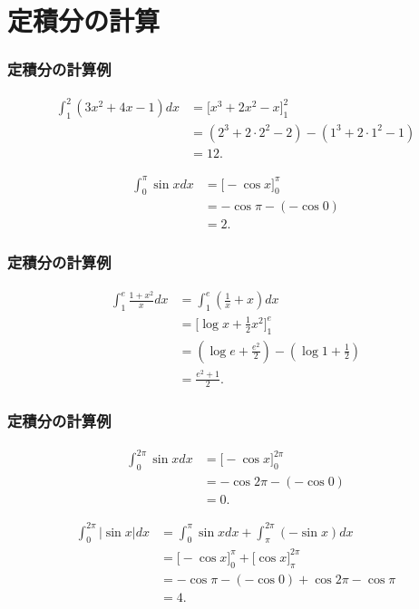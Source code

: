 \section{定積分の計算}

\begin{frame}
\frametitle{定積分の計算例}

\begin{align*}
\int_1^2(3x^2+4x-1)dx & = \big[x^3+2x^2-x\big]_1^2 \\
& = (2^3+2\cdot 2^2-2)-(1^3+2\cdot 1^2-1) \\
& = 12. 
\end{align*}


\begin{align*}
\int_0^\pi \sin x dx & = \big[ -\cos x\big]_0^\pi \\
& = -\cos \pi - (- \cos 0) \\
& = 2. 
\end{align*}

\end{frame}




\begin{frame}
\frametitle{定積分の計算例}

\begin{align*}
\int_1^e\frac{1+x^2}{x}dx & = \int_1^e(\frac{1}{x}+x)dx \\
& = \big[ \log x + \frac{1}{2}x^2\big]_1^e \\
& = (\log e + \frac{e^2}{2})-(\log 1 +\frac{1}{2})\\
& = \frac{e^2+1}{2}. 
\end{align*}


\end{frame}




\begin{frame}
\frametitle{定積分の計算例}


\begin{align*}
\int_0^{2\pi} \sin x dx & = \big[ -\cos x\big]_0^{2\pi} \\
& = -\cos 2\pi - (- \cos 0) \\
& =0. 
\end{align*}

\begin{align*}
\int_0^{2\pi} |\sin x| dx & = \int_0^{\pi} \sin x dx + \int_\pi^{2\pi} (-\sin x) dx \\
& = \big[ -\cos x\big]_0^{\pi} +  \big[ \cos x\big]_\pi^{2\pi} \\
& = -\cos \pi - (- \cos 0) + \cos 2\pi - \cos \pi \\
& =4. 
\end{align*}

\end{frame}



